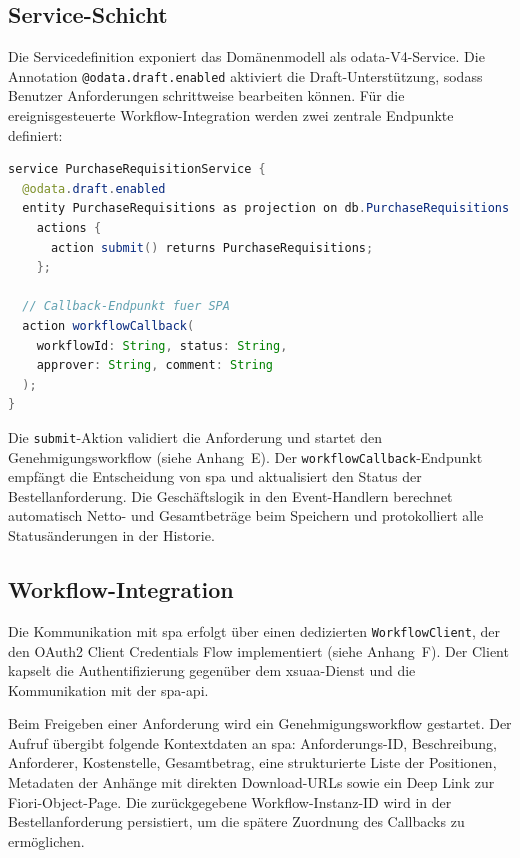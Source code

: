 \subsection{Service-Schicht}

Die Servicedefinition exponiert das Domänenmodell als \gls{odata}-V4-Service. Die Annotation \texttt{@odata.draft.enabled} aktiviert die Draft-Unterstützung, sodass Benutzer Anforderungen schrittweise bearbeiten können. Für die ereignisgesteuerte Workflow-Integration werden zwei zentrale Endpunkte definiert:

\begin{lstlisting}[language=Java, caption={Service-Definition mit Aktionen}, label={lst:service-def}]
service PurchaseRequisitionService {
  @odata.draft.enabled
  entity PurchaseRequisitions as projection on db.PurchaseRequisitions
    actions {
      action submit() returns PurchaseRequisitions;
    };

  // Callback-Endpunkt fuer SPA
  action workflowCallback(
    workflowId: String, status: String,
    approver: String, comment: String
  );
}
\end{lstlisting}

Die \texttt{submit}-Aktion validiert die Anforderung und startet den Genehmigungsworkflow (siehe Anhang~E). Der \texttt{workflowCallback}-Endpunkt empfängt die Entscheidung von \gls{spa} und aktualisiert den Status der Bestellanforderung. Die Geschäftslogik in den Event-Handlern berechnet automatisch Netto- und Gesamtbeträge beim Speichern und protokolliert alle Statusänderungen in der Historie.

\subsection{Workflow-Integration}

Die Kommunikation mit \gls{spa} erfolgt über einen dedizierten \texttt{WorkflowClient}, der den OAuth2 Client Credentials Flow implementiert (siehe Anhang~F). Der Client kapselt die Authentifizierung gegenüber dem \gls{xsuaa}-Dienst und die Kommunikation mit der \gls{spa}-\gls{api}.

Beim Freigeben einer Anforderung wird ein Genehmigungsworkflow gestartet. Der Aufruf übergibt folgende Kontextdaten an \gls{spa}: Anforderungs-ID, Beschreibung, Anforderer, Kostenstelle, Gesamtbetrag, eine strukturierte Liste der Positionen, Metadaten der Anhänge mit direkten Download-URLs sowie ein Deep Link zur Fiori-Object-Page. Die zurückgegebene Workflow-Instanz-ID wird in der Bestellanforderung persistiert, um die spätere Zuordnung des Callbacks zu ermöglichen.

